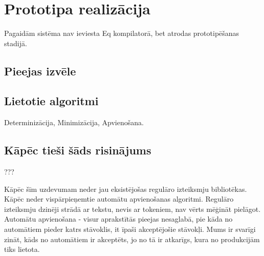 \section{Prototipa realizācija}
Pagaidām sistēma nav ieviesta Eq kompilatorā, bet atrodas prototipēšanas stadijā. 
\subsection{Pieejas izvēle}

\subsection{Lietotie algoritmi}
Determinizācija,
Minimizācija,
Apvienošana.

\subsection{Kāpēc tieši šāds risinājums}
???

Kāpēc šīm uzdevumam neder jau eksistējošas regulāro izteiksmju bibliotēkas. Kāpēc  neder vispārpieņemtie automātu apvienošanas algoritmi.
Regulāro izteiksmju dzinēji strādā ar tekstu, nevis ar tokeniem, nav vērts mēģināt pielāgot. Automātu apvienošana - visur aprakstītās pieejas nesaglabā, pie kāda no automātiem pieder katrs stāvoklis, it īpaši akceptējošie stāvokļi. Mums ir svarīgi zināt, kāds no automātiem ir akceptēts, jo no tā ir atkarīgs, kura no produkcijām tiks lietota. 


